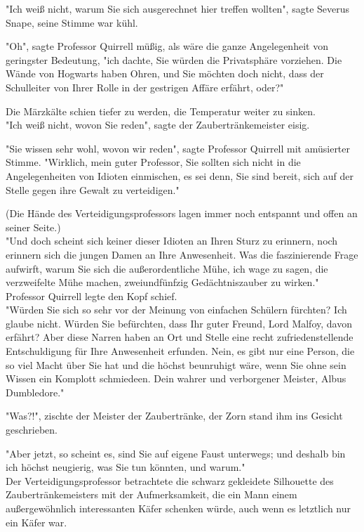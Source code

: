 {"Ich weiß nicht, warum Sie sich ausgerechnet hier treffen wollten", sagte Severus Snape, seine Stimme war kühl.

"Oh", sagte Professor Quirrell müßig, als wäre die ganze Angelegenheit von geringster Bedeutung, "ich dachte, Sie würden die Privatsphäre vorziehen. Die Wände von Hogwarts haben Ohren, und Sie möchten doch nicht, dass der Schulleiter von Ihrer Rolle in der gestrigen Affäre erfährt, oder?"

Die Märzkälte schien tiefer zu werden, die Temperatur weiter zu sinken.\\ "Ich weiß nicht, wovon Sie reden", sagte der Zaubertränkemeister eisig.

"Sie wissen sehr wohl, wovon wir reden", sagte Professor Quirrell mit amüsierter Stimme. "Wirklich, mein guter Professor, Sie sollten sich nicht in die Angelegenheiten von Idioten einmischen, es sei denn, Sie sind bereit, sich auf der Stelle gegen ihre Gewalt zu verteidigen."

(Die Hände des Verteidigungsprofessors lagen immer noch entspannt und offen an seiner Seite.)\\ "Und doch scheint sich keiner dieser Idioten an Ihren Sturz zu erinnern, noch erinnern sich die jungen Damen an Ihre Anwesenheit. Was die faszinierende Frage aufwirft, warum Sie sich die außerordentliche Mühe, ich wage zu sagen, die verzweifelte Mühe machen, zweiundfünfzig Gedächtniszauber zu wirken."\\ Professor Quirrell legte den Kopf schief.\\ "Würden Sie sich so sehr vor der Meinung von einfachen Schülern fürchten? Ich glaube nicht. Würden Sie befürchten, dass Ihr guter Freund, Lord Malfoy, davon erfährt? Aber diese Narren haben an Ort und Stelle eine recht zufriedenstellende Entschuldigung für Ihre Anwesenheit erfunden. Nein, es gibt nur eine Person, die so viel Macht über Sie hat und die höchst beunruhigt wäre, wenn Sie ohne sein Wissen ein Komplott schmiedeen. Dein wahrer und verborgener Meister, Albus Dumbledore."

"Was?!", zischte der Meister der Zaubertränke, der Zorn stand ihm ins Gesicht geschrieben.

"Aber jetzt, so scheint es, sind Sie auf eigene Faust unterwegs; und deshalb bin ich höchst neugierig, was Sie tun könnten, und warum."\\ Der Verteidigungsprofessor betrachtete die schwarz gekleidete Silhouette des Zaubertränkemeisters mit der Aufmerksamkeit, die ein Mann einem außergewöhnlich interessanten Käfer schenken würde, auch wenn es letztlich nur ein Käfer war.

}
